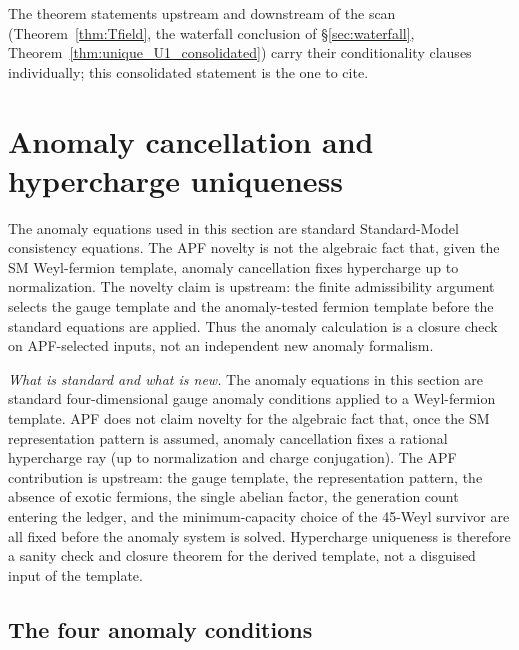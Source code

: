\documentclass[11pt]{article}
\theoremstyle{definition}
\begin{document}
\noindent The theorem statements upstream and downstream of the scan
(Theorem~\ref{thm:Tfield}, the waterfall conclusion of
\S\ref{sec:waterfall}, Theorem~\ref{thm:unique_U1_consolidated}) carry
their conditionality clauses individually; this consolidated statement
is the one to cite.


\newpage


\section{Anomaly cancellation and hypercharge uniqueness}
\label{sec:hypercharge}


\begin{tcolorbox}[apfbox, title={Novelty boundary: standard anomaly algebra versus APF input selection}]
\footnotesize
The anomaly equations used in this section are standard Standard-Model
consistency equations.  The APF novelty is not the algebraic fact that,
given the SM Weyl-fermion template, anomaly cancellation fixes hypercharge up to
normalization.  The novelty claim is upstream: the finite admissibility
argument selects the gauge template and the anomaly-tested fermion template
before the standard equations are applied.  Thus the anomaly calculation is
a closure check on APF-selected inputs, not an independent new anomaly
formalism.
\end{tcolorbox}

\noindent\textit{What is standard and what is new.}\quad
The anomaly equations in this section are standard four-dimensional gauge
anomaly conditions applied to a Weyl-fermion template.  APF does not
claim novelty for the algebraic fact that, once the SM representation
pattern is assumed, anomaly cancellation fixes a rational hypercharge ray
(up to normalization and charge conjugation).  The APF contribution is
upstream: the gauge template, the representation pattern, the absence of
exotic fermions, the single abelian factor, the generation count entering
the ledger, and the minimum-capacity choice of the 45-Weyl survivor are
all fixed before the anomaly system is solved.  Hypercharge uniqueness is
therefore a sanity check and closure theorem for the derived template, not
a disguised input of the template.


\subsection{The four anomaly conditions}
\label{sec:anomaly_conditions}
\end{document}
